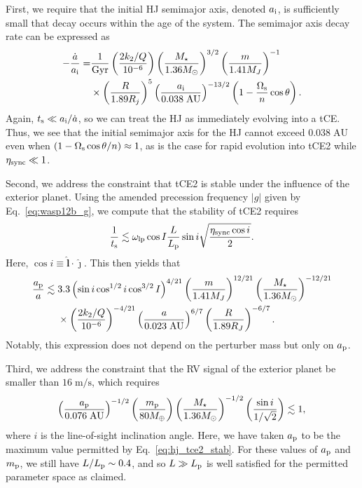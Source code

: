 \documentclass[
        fleqn,
        usenatbib,
        referee,
    ]{mnras}
\newcommand*{\abs}[1]{\left|#1\right|}
\newcommand*{\p}[1]{\left(#1\right)}
\newcommand*{\s}[1]{\left[#1\right]}
\newcommand*{\uv}[1]{\hat{\boldsymbol{\mathbf{#1}}}}
\begin{document}
First, we require that the initial HJ semimajor axis, denoted $a_{\rm i}$, is
sufficiently small that decay occurs within the age of the system. The semimajor
axis decay rate can be expressed as
\begin{align}
    -\frac{\dot{a}}{a_{\rm i}}
        =& \frac{1}{\mathrm{Gyr}}
            \p{\frac{2k_2/Q}{10^{-6}}}
            \p{\frac{M_\star}{1.36 M_{\odot}}}^{3/2}
            \p{\frac{m}{1.41M_J}}^{-1}\nonumber\\
        &\times \p{\frac{R}{1.89R_j}}^5
            \p{\frac{a_{\rm i}}{0.038\;\mathrm{AU}}}^{-13/2}
            \p{1 - \frac{\Omega_{\rm s}}{n}\cos \theta}.
            \label{eq:hj_adot}
\end{align}
Again, $t_{\rm s} \ll a_{\rm i} / \dot{a}$, so we can treat the HJ as
immediately evolving into a tCE\@. Thus, we see that the initial semimajor axis
for the HJ cannot exceed $0.038\;\mathrm{AU}$ even when $\p{1 - \Omega_{\rm
s}\cos \theta/n} \approx 1$, as is the case for rapid evolution into tCE2 while
$\eta_{\rm sync} \ll 1$.

Second, we address the constraint that tCE2 is stable under the influence of the
exterior planet. Using the amended precession frequency $\abs{g}$ given by
Eq.~\eqref{eq:wasp12b_g}, we compute that the stability of tCE2 requires
\begin{equation}
    \frac{1}{t_{\rm s}} \lesssim \omega_{\rm lp}\cos I \frac{L}{L_{\rm p}}
        \sin i \sqrt{\frac{\eta_{\rm sync}\cos i}{2}}.
\end{equation}
Here, $\cos i \equiv \uv{l} \cdot \uv{\jmath}$. This then yields that
\begin{align}
    \frac{a_{\rm p}}{a}
        \lesssim{}& 3.3 \p{\sin i \cos^{1/2} i \cos^{3/2} I}^{4/21}
            \p{\frac{m}{1.41 M_J}}^{12/21}
            \p{\frac{M_\star}{1.36 M_{\odot}}}^{-12/21}\nonumber\\
        &\times \p{\frac{2k_2/Q}{10^{-6}}}^{-4/21}
            \p{\frac{a}{0.023\;\mathrm{AU}}}^{6/7}
            \p{\frac{R}{1.89 R_J}}^{-6/7}.\label{eq:hj_tce2_stab}
\end{align}
Notably, this expression does not depend on the perturber mass but only on
$a_{\rm p}$.

Third, we address the constraint that the RV signal of the exterior planet be
smaller than $16\;\mathrm{m/s}$, which requires
\begin{equation}
    \p{\frac{a_{\rm p}}{0.076\;\mathrm{AU}}}^{-1/2}
    \p{\frac{m_{\rm p}}{80M_{\oplus}}}
    \p{\frac{M_\star}{1.36M_{\odot}}}^{-1/2}
    \p{\frac{\sin i}{1 / \sqrt{2}}} \lesssim 1,
    \label{eq:hj_rv}
\end{equation}
where $i$ is the line-of-sight inclination angle. Here, we have taken $a_{\rm
p}$ to be the maximum value permitted by Eq.~\eqref{eq:hj_tce2_stab}. For these
values of $a_{\rm p}$ and $m_{\rm p}$, we still have $L / L_{\rm p} \sim 0.4$,
and so $L \gg L_{\rm p}$ is well satisfied for the permitted parameter space as
claimed.
\end{document}
